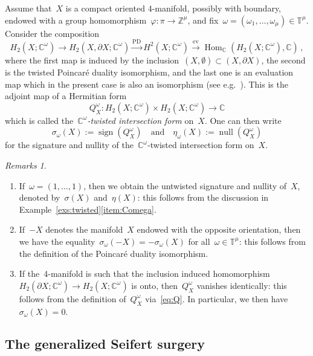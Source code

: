\documentclass{amsart}
\newcommand{\Z}{\mathbb{Z}}
\newcommand{\C}{\mathbb{C}}
\newcommand{\T}{\mathbb{T}}
\newcommand{\sign}{\operatorname{sign}}
\theoremstyle{definition}
\theoremstyle{remark}
\newtheorem{rems}[thm]{Remarks}
\begin{document}
Assume that~$X$ is a compact oriented $4$-manifold, possibly with boundary, endowed with a group homomorphism~$\varphi\colon\pi\to\Z^\mu$, and fix~$\omega=(\omega_1,\dots,\omega_\mu)\in\T^\mu$. Consider the composition
\begin{equation}
	\label{eq:Q}
	H_2(X;\C^\omega)\longrightarrow H_2(X,\partial X;\C^\omega)\stackrel{\mathrm{PD}}{\longrightarrow} H^2(X;\C^\omega)\stackrel{\mathrm{ev}}{\longrightarrow} \operatorname{Hom}_\C(H_2(X;\C^\omega),\C)\,,
\end{equation}
where the first map is induced by the inclusion~$(X,\emptyset)\subset(X,\partial X)$, the second is the twisted Poincaré duality isomorphism, and the last one is an evaluation map which in the present case is also an
isomorphism (see e.g.~\cite[Proposition~2.3]{CNT}). This is the adjoint map of a Hermitian form
\[
Q_X^{\omega}\colon H_2(X;\C^\omega)\times H_2(X;\C^\omega)\longrightarrow\C
\]
which is called the~$\C^\omega${\em-twisted intersection form\/} on~$X$. One can then write
\[
\sigma_\omega(X):=\sign(Q_X^\omega)\quad\text{and}\quad\eta_\omega(X):=\operatorname{null}(Q_X^\omega)
\]
for the signature and nullity of the~$\C^\omega$-twisted intersection form on~$X$.

\begin{rems}
	\label{rems:int}
	\begin{enumerate}
		\item\label{rems:int-1} If~$\omega=(1,\dots,1)$, then
		we obtain the untwisted signature and nullity of~$X$, denoted by~$\sigma(X)$ and~$\eta(X)$: this follows from
		the discussion in Example~\ref{exs:twisted}\ref{item:Comega}.
		\item\label{rems:int-2} If~$-X$ denotes the manifold~$X$ endowed with the opposite orientation, then we have
		the equality~$\sigma_\omega(-X)=-\sigma_\omega(X)$ for all~$\omega\in\mathbb{T}^\mu$: this follows from the definition of the Poincaré duality isomorphism.
		\item\label{rems:int-3} If the~4-manifold is such that the inclusion induced homomorphism~$H_2(\partial X;\C^\omega)\to H_2(X;\C^\omega)$ is onto, then~$Q^\omega_X$ vanishes identically: this follows from the definition of~$Q^\omega_X$ via~\eqref{eq:Q}. In particular, we then have~$\sigma_\omega(X)=0$.
	\end{enumerate}
\end{rems}

	\subsection{The generalized Seifert surgery}
	\label{sub:ML}
	
\end{document}
